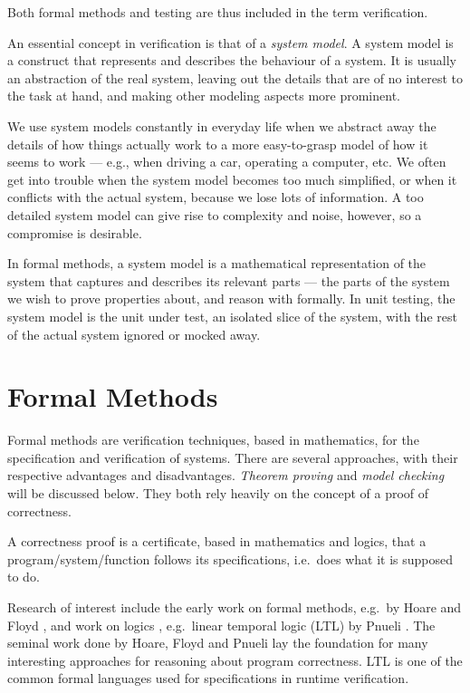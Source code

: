 Both formal methods and testing are thus included in the term verification.

An essential concept in verification is that of a \textit{system model}. A
system model is a construct that represents and describes the behaviour of a
system. It is usually an abstraction of the real system, leaving out the
details that are of no interest to the task at hand, and making other modeling
aspects more prominent.

We use system models constantly in everyday life when we abstract away the
details of how things actually work to a more easy-to-grasp model of how it
seems to work --- e.g., when driving a car, operating a computer, etc. We often
get into trouble when the system model becomes too much simplified, or when it
conflicts with the actual system, because we lose lots of information. A too
detailed system model can give rise to complexity and noise, however, so a
compromise is desirable.

In formal methods, a system model is a mathematical representation of the
system that captures and describes its relevant parts --- the parts of the
system we wish to prove properties about, and reason with formally. In unit
testing, the system model is the unit under test, an isolated slice of the
system, with the rest of the actual system ignored or mocked away.


\section{Formal Methods} \label{section-formal-methods}

Formal methods are verification techniques, based in mathematics, for the
specification and verification of systems. There are several approaches, with
their respective advantages and disadvantages. \textit{Theorem proving} and
\textit{model checking} will be discussed below. They both rely heavily on the
concept of a proof of correctness.

A correctness proof is a certificate, based in mathematics and logics, that a
program/system/function follows its specifications, i.e.\ does what it is
supposed to do.

Research of interest include the early work on formal methods, e.g.\ by Hoare
\cite{hoare69} and Floyd \cite{floyd67}, and work on logics , e.g.\ linear
temporal logic (LTL) by Pnueli \cite{pnueli77}. The seminal work done by Hoare,
Floyd and Pnueli lay the foundation for many interesting approaches for
reasoning about program correctness. LTL is one of the common formal languages
used for specifications in runtime verification.

